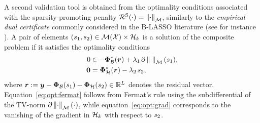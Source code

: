 \documentclass[12pt]{article}
\begin{document}
        A second validation tool is obtained from the optimality conditions associated with the sparsity-promoting penalty $\mathcal{R}^\mathrm{S}(\cdot) = \left\lVert\cdot\right\rVert_\mathcal{M}$, similarly to the \emph{empirical dual certificate} commonly considered in the B-LASSO literature (see for instance \cite{duval2017sparseI,denoyelle2019sliding,jarret_grid_2025}). A pair of elements $(s_1, s_2) \in {\mathcal{M}}({\mathcal{X}}) \times \mathcal{H}_k$ is a solution of the composite problem if it satisfies the optimality conditions
        \begin{align}
            0 &\in -\bm{\Phi}_\mathcal{B}^* (\bm{r}) + \lambda_{1} \, \partial \left\lVert\cdot\right\rVert_\mathcal{M}(s_1), \label{eq:opt:fermat}\\
            \bm{0} &= \bm{\Phi}_\mathcal{H}^*(\bm{r}) - \lambda_{2} \, s_2, \label{eq:opt:grad}
        \end{align}
        where $\bm{r} := \bm{y} - \bm{\Phi}_\mathcal{B}(s_1) - \bm{\Phi}_\mathcal{H}(s_2) \in \mathbb{R}^L$ denotes the residual vector. Equation~\eqref{eq:opt:fermat} follows from Fermat's rule using the subdifferential of the TV-norm $\partial \left\lVert\cdot\right\rVert_\mathcal{M}(\cdot)$, while equation~\eqref{eq:opt:grad} corresponds to the vanishing of the gradient in $\mathcal{H}_k$ with respect to $s_2$.
\end{document}
